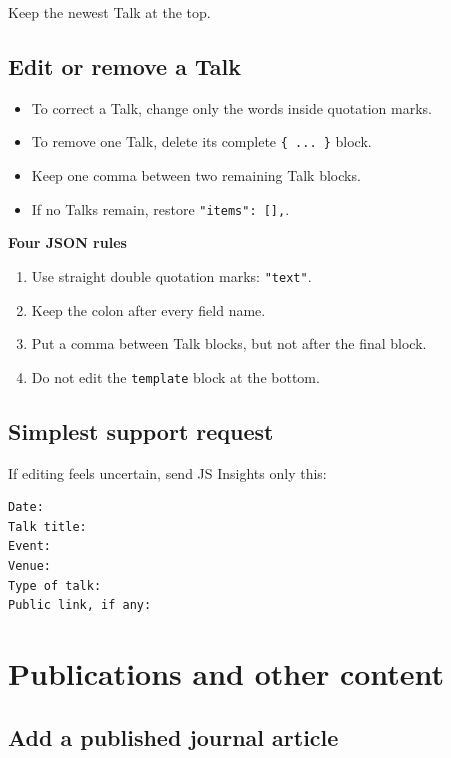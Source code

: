 \documentclass[10pt,a4paper]{article}
\begin{document}
Keep the newest Talk at the top.

\subsection{Edit or remove a Talk}

\begin{itemize}
  \item To correct a Talk, change only the words inside quotation marks.
  \item To remove one Talk, delete its complete \texttt{\{ ... \}} block.
  \item Keep one comma between two remaining Talk blocks.
  \item If no Talks remain, restore \texttt{"items": [],}.
\end{itemize}

\begin{tcolorbox}[gold]
\textbf{Four JSON rules}
\begin{enumerate}
  \item Use straight double quotation marks: \texttt{"text"}.
  \item Keep the colon after every field name.
  \item Put a comma between Talk blocks, but not after the final block.
  \item Do not edit the \texttt{template} block at the bottom.
\end{enumerate}
\end{tcolorbox}

\subsection{Simplest support request}

If editing feels uncertain, send JS Insights only this:

\begin{lstlisting}
Date:
Talk title:
Event:
Venue:
Type of talk:
Public link, if any:
\end{lstlisting}

\clearpage
\section{Publications and other content}

\subsection{Add a published journal article}
\end{document}
